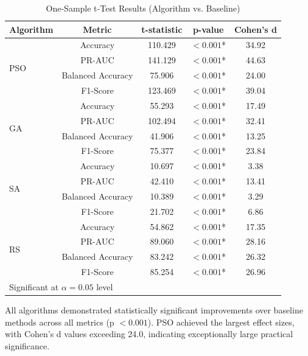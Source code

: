 \begin{table}[H]
\centering
\caption{One-Sample t-Test Results (Algorithm vs. Baseline)}
\label{tab:one_sample_testing}
\begin{tabular}{lcccc}
\toprule
\textbf{Algorithm} & \textbf{Metric} & \textbf{t-statistic} & \textbf{p-value} & \textbf{Cohen's d} \\
\midrule
\multirow{4}{*}{PSO} & Accuracy & 110.429 & $< 0.001$* & 34.92 \\
                     & PR-AUC & 141.129 & $< 0.001$* & 44.63 \\
                     & Balanced Accuracy & 75.906 & $< 0.001$* & 24.00 \\
                     & F1-Score & 123.469 & $< 0.001$* & 39.04 \\
\midrule
\multirow{4}{*}{GA}  & Accuracy & 55.293 & $< 0.001$* & 17.49 \\
                     & PR-AUC & 102.494 & $< 0.001$* & 32.41 \\
                     & Balanced Accuracy & 41.906 & $< 0.001$* & 13.25 \\
                     & F1-Score & 75.377 & $< 0.001$* & 23.84 \\
\midrule
\multirow{4}{*}{SA}  & Accuracy & 10.697 & $< 0.001$* & 3.38 \\
                     & PR-AUC & 42.410 & $< 0.001$* & 13.41 \\
                     & Balanced Accuracy & 10.389 & $< 0.001$* & 3.29 \\
                     & F1-Score & 21.702 & $< 0.001$* & 6.86 \\
\midrule
\multirow{4}{*}{RS}  & Accuracy & 54.862 & $< 0.001$* & 17.35 \\
                     & PR-AUC & 89.060 & $< 0.001$* & 28.16 \\
                     & Balanced Accuracy & 83.242 & $< 0.001$* & 26.32 \\
                     & F1-Score & 85.254 & $< 0.001$* & 26.96 \\
\bottomrule
\multicolumn{5}{l}{\small * Significant at $\alpha = 0.05$ level}
\end{tabular}
\end{table}

All algorithms demonstrated statistically significant improvements over baseline methods across all metrics (p $< 0.001$). PSO achieved the largest effect sizes, with Cohen's d values exceeding 24.0, indicating exceptionally large practical significance.

